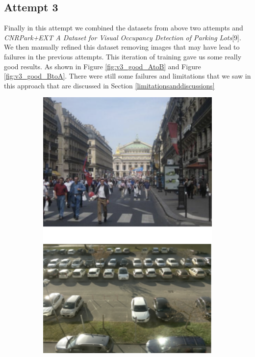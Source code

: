 \documentclass{article}
\begin{document}
\subsection{Attempt 3}

Finally in this attempt we combined the datasets from above two attempts and \textit{CNRPark+EXT
A Dataset for Visual Occupancy Detection of Parking Lots}[9]. We then manually refined this dataset removing images that may have lead to failures in the previous attempts. This iteration of training gave us some really good results. As shown in Figure \ref{fig:v3_good_AtoB} and Figure \ref{fig:v3_good_BtoA}. There were still some failures and limitations that we saw in this approach that are discussed in Section \ref{limitationsanddiscussions}

\begin{figure}
	\begin{subfigure}{.5\textwidth}
		\centering
		\includegraphics[width=.9\linewidth]{images/v3_real_A.png}

\end{subfigure}
\end{figure}
\end{document}

